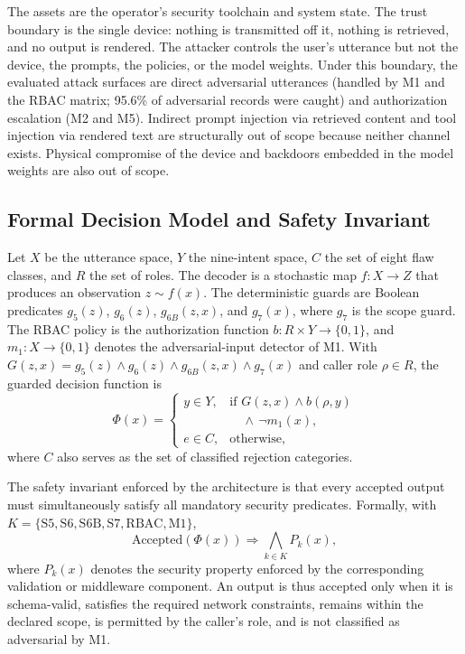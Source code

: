 \documentclass[a4paper,twoside]{article}
\begin{document}
\noindent The assets are the operator's security toolchain and system state. The trust boundary is the single device: nothing is transmitted off it, nothing is retrieved, and no output is rendered. The attacker controls the user's utterance but not the device, the prompts, the policies, or the model weights. Under this boundary, the evaluated attack surfaces are direct adversarial utterances (handled by M1 and the RBAC matrix; 95.6\% of adversarial records were caught) and authorization escalation (M2 and M5). Indirect prompt injection via retrieved content and tool injection via rendered text are structurally out of scope because neither channel exists. Physical compromise of the device and backdoors embedded in the model weights are also out of scope.

\subsection{Formal Decision Model and Safety Invariant}
\label{subsec:formal}

\noindent Let $X$ be the utterance space, $Y$ the nine-intent space, $C$ the set of eight flaw classes, and $R$ the set of roles. The decoder is a stochastic map $f: X \rightarrow Z$ that produces an observation $z \sim f(x)$. The deterministic guards are Boolean predicates $g_5(z)$, $g_6(z)$, $g_{6B}(z,x)$, and $g_7(x)$, where $g_7$ is the scope guard. The RBAC policy is the authorization function $b: R \times Y \rightarrow \{0,1\}$, and $m_1: X \rightarrow \{0,1\}$ denotes the adversarial-input detector of M1. With $G(z,x) = g_5(z) \wedge g_6(z) \wedge g_{6B}(z,x) \wedge g_7(x)$ and caller role $\rho \in R$, the guarded decision function is
\begin{equation}\label{eq:decision}
\Phi(x)=\begin{cases}
y\in Y, & \text{if } G(z,x)\wedge b(\rho,y)\\
        & \quad\wedge\, \lnot m_1(x),\\
e\in C, & \text{otherwise,}
\end{cases}
\end{equation}
where $C$ also serves as the set of classified rejection categories.

The safety invariant enforced by the architecture is that every accepted output must simultaneously satisfy all mandatory security predicates. Formally, with $K=\{\mathrm{S5},\mathrm{S6},\mathrm{S6B},\mathrm{S7},\mathrm{RBAC},\mathrm{M1}\}$,
\begin{equation}\label{eq:invariant}
\mathrm{Accepted}(\Phi(x)) \Rightarrow \bigwedge_{k\in K} P_k(x),
\end{equation}
where $P_k(x)$ denotes the security property enforced by the corresponding validation or middleware component. An output is thus accepted only when it is schema-valid, satisfies the required network constraints, remains within the declared scope, is permitted by the caller's role, and is not classified as adversarial by M1.
\end{document}
